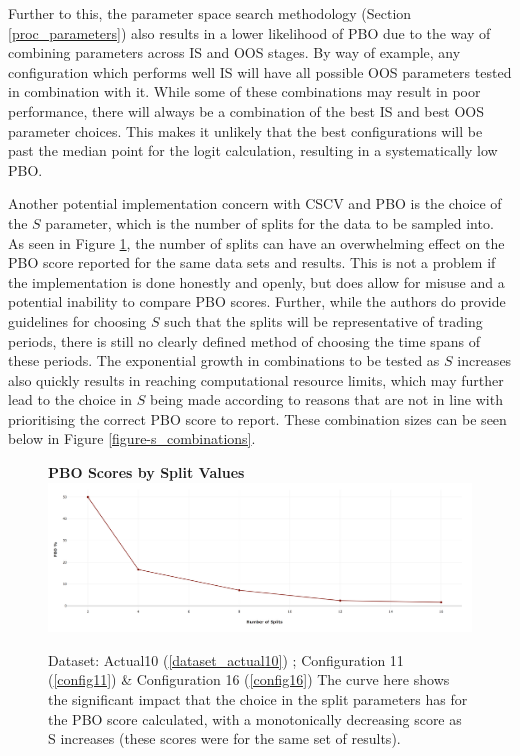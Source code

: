\documentclass[a4paper,11pt,oneside]{article}
\theoremstyle{plain}
\theoremstyle{definition}
\begin{document}
	Further to this, the parameter space search methodology (Section \ref{proc_parameters}) also results in a lower likelihood of PBO due to the way of combining parameters across IS and OOS stages. By way of example, any configuration which performs well IS will have all possible OOS parameters tested in combination with it. While some of these combinations may result in poor performance, there will always be a combination of the best IS and best OOS parameter choices. This makes it unlikely that the best configurations will be past the median point for the logit calculation, resulting in a systematically low PBO.\newline
	
	Another potential implementation concern with CSCV and PBO is the choice of the $S$ parameter, which is the number of splits for the data to be sampled into. As seen in Figure \ref{figure-PBO_by_Split}, the number of splits can have an overwhelming effect on the PBO score reported for the same data sets and results. This is not a problem if the implementation is done honestly and openly, but does allow for misuse and a potential inability to compare PBO scores. Further, while the authors do provide guidelines for choosing $S$ such that the splits will be representative of trading periods, there is still no clearly defined method of choosing the time spans of these periods. The exponential growth in combinations to be tested as $S$ increases also quickly results in reaching computational resource limits, which may further lead to the choice in $S$ being made according to reasons that are not in line with prioritising the correct PBO score to report. These combination sizes can be seen below in Figure \ref{figure-s_combinations}.
	
	\begin{figure}[H]
		\centering 
		\textbf{PBO Scores by Split Values}
		\includegraphics[scale=0.25]{images/results/pbo/PBO_by_Split.png} 
		\caption[PBO Scores by Split Values]{Dataset: Actual10 (\ref{dataset_actual10}) ; Configuration 11 (\ref{config11}) \&  Configuration 16 (\ref{config16})
			\newline The curve here shows the significant impact that the choice in the split parameters has for the PBO score calculated, with a monotonically decreasing score as S increases (these scores were for the same set of results). }
		\label{figure-PBO_by_Split}
	\end{figure}
	
\end{document}
